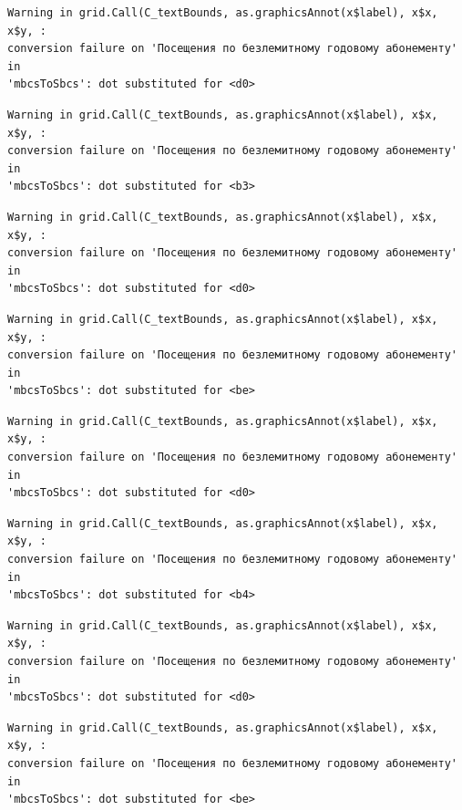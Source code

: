 \documentclass[
  letterpaper,
  DIV=11,
  numbers=noendperiod]{scrartcl}
\begin{document}
\begin{verbatim}
Warning in grid.Call(C_textBounds, as.graphicsAnnot(x$label), x$x, x$y, :
conversion failure on 'Посещения по безлемитному годовому абонементу' in
'mbcsToSbcs': dot substituted for <d0>
\end{verbatim}

\begin{verbatim}
Warning in grid.Call(C_textBounds, as.graphicsAnnot(x$label), x$x, x$y, :
conversion failure on 'Посещения по безлемитному годовому абонементу' in
'mbcsToSbcs': dot substituted for <b3>
\end{verbatim}

\begin{verbatim}
Warning in grid.Call(C_textBounds, as.graphicsAnnot(x$label), x$x, x$y, :
conversion failure on 'Посещения по безлемитному годовому абонементу' in
'mbcsToSbcs': dot substituted for <d0>
\end{verbatim}

\begin{verbatim}
Warning in grid.Call(C_textBounds, as.graphicsAnnot(x$label), x$x, x$y, :
conversion failure on 'Посещения по безлемитному годовому абонементу' in
'mbcsToSbcs': dot substituted for <be>
\end{verbatim}

\begin{verbatim}
Warning in grid.Call(C_textBounds, as.graphicsAnnot(x$label), x$x, x$y, :
conversion failure on 'Посещения по безлемитному годовому абонементу' in
'mbcsToSbcs': dot substituted for <d0>
\end{verbatim}

\begin{verbatim}
Warning in grid.Call(C_textBounds, as.graphicsAnnot(x$label), x$x, x$y, :
conversion failure on 'Посещения по безлемитному годовому абонементу' in
'mbcsToSbcs': dot substituted for <b4>
\end{verbatim}

\begin{verbatim}
Warning in grid.Call(C_textBounds, as.graphicsAnnot(x$label), x$x, x$y, :
conversion failure on 'Посещения по безлемитному годовому абонементу' in
'mbcsToSbcs': dot substituted for <d0>
\end{verbatim}

\begin{verbatim}
Warning in grid.Call(C_textBounds, as.graphicsAnnot(x$label), x$x, x$y, :
conversion failure on 'Посещения по безлемитному годовому абонементу' in
'mbcsToSbcs': dot substituted for <be>
\end{verbatim}
\end{document}
